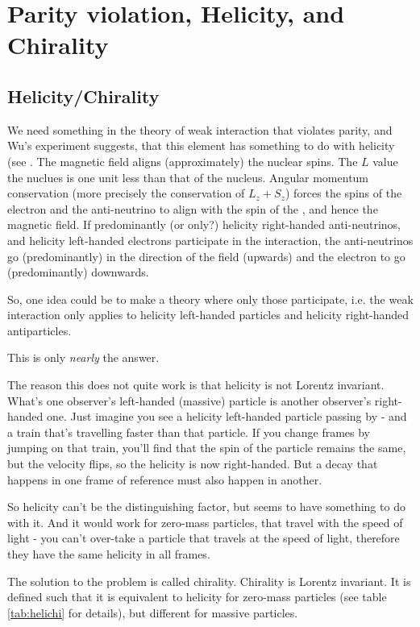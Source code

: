 \section{Parity violation, Helicity, and Chirality}
\subsection{Helicity/Chirality}
 We need something in the theory of weak interaction that violates
 parity, and Wu's experiment suggests, that this element has something
 to do with helicity (see . The magnetic field aligns (approximately) the nuclear spins. The $L$ value the  nuclues is one unit less than that of the  nucleus. Angular momentum conservation (more precisely the conservation of $L_z + S_z$) forces the spins of the electron and the anti-neutrino to align with the spin of the , and hence the magnetic field.
 If predominantly (or only?) helicity
 right-handed anti-neutrinos, and helicity left-handed electrons participate in the interaction, the anti-neutrinos go (predominantly) in the direction of the field (upwards) and the electron to go (predominantly) downwards.
 
 So, one idea could be to make
 a theory where only those participate, i.e. the weak interaction only
 applies to helicity left-handed particles and helicity right-handed
 antiparticles.

 This is only \emph{nearly} the answer.

 The reason this does not quite work is that helicity is not Lorentz
 invariant. What's one observer's left-handed (massive) particle is
 another observer's right-handed one. Just imagine you see a helicity
 left-handed particle passing by - and a train that's travelling faster
 than that particle. If you change frames by jumping on that train,
 you'll find that the spin of the particle remains the same, but the
 velocity flips, so the helicity is now right-handed.  But a decay
 that happens in one frame of reference must also happen in
 another.

 So helicity can't be the distinguishing factor, but seems to have
 something to do with it. And it would work for zero-mass particles,
 that travel with the speed of light - you can't over-take a particle
 that travels at the speed of light, therefore they have the same
 helicity in all frames.

 The solution to the problem is called chirality. Chirality is Lorentz
 invariant. It is defined such that it is equivalent to helicity for
 zero-mass particles (see table \ref{tab:helichi} for details), but
 different for massive particles.

